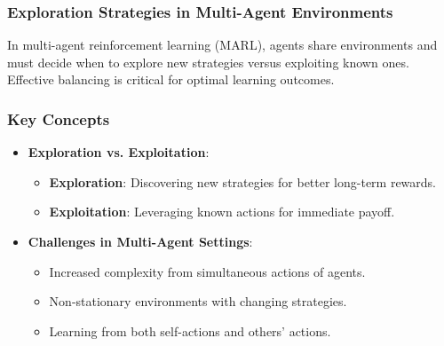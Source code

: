 \documentclass[aspectratio=169]{beamer}
\begin{document}
\begin{frame}[fragile]
    \frametitle{Exploration Strategies in Multi-Agent Environments}
    In multi-agent reinforcement learning (MARL), agents share environments and must decide when to explore new strategies versus exploiting known ones. Effective balancing is critical for optimal learning outcomes.
\end{frame}

\begin{frame}[fragile]
    \frametitle{Key Concepts}
    \begin{itemize}
        \item \textbf{Exploration vs. Exploitation}:
            \begin{itemize}
                \item \textbf{Exploration}: Discovering new strategies for better long-term rewards.
                \item \textbf{Exploitation}: Leveraging known actions for immediate payoff.
            \end{itemize}
        \item \textbf{Challenges in Multi-Agent Settings}:
            \begin{itemize}
                \item Increased complexity from simultaneous actions of agents.
                \item Non-stationary environments with changing strategies.
                \item Learning from both self-actions and others' actions.
            \end{itemize}
    \end{itemize}
\end{frame}
\end{document}

